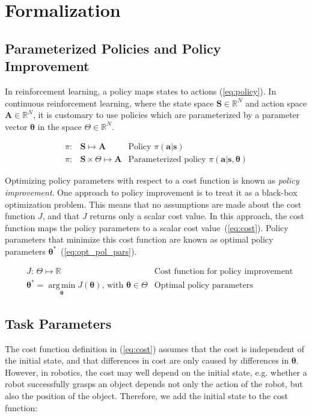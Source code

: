 \documentclass[12pt]{article}
\newcommand{\mymath}[1]{\ensuremath{#1}\xspace}
\newcommand{\act}    {\mymath{\mathbf{a}}}
\newcommand{\actsp}  {\mymath{\mathbf{A}}}
\newcommand{\sta}    {\mymath{\mathbf{s}}}
\newcommand{\stasp}  {\mymath{\mathbf{S}}}
\newcommand{\app}    {\mymath{\bm{\theta}}}
\newcommand{\appsp}  {\mymath{\Theta}}
\newcommand{\costf}  {\mymath{J}}
\DeclareMathOperator*{\argmin}{arg\,min}
\newcommand{\argminvar}[1]{\ensuremath{\underset{#1}{{\argmin}}}}
\begin{document}
\section{Formalization}

\subsection{Parameterized Policies and Policy Improvement}
\label{sec:parameterized_policies}

In reinforcement learning, a policy maps states to actions (\ref{eq:policy}). In continuous reinforcement learning, where the state space $\stasp \in \mathbb{R}^N$ and action space $\actsp \in \mathbb{R}^N$,  it is customary to use policies which are parameterized by a parameter vector \app in the space $\appsp  \in \mathbb{R}^N$.

\begin{align}
\label{eq:policy}     \pi:& \stasp               \mapsto \actsp & \mbox{Policy~} \pi(\act|\sta)\\
\label{eq:policy_par} \pi:& \stasp \times \appsp \mapsto \actsp & \mbox{Parameterized policy~} \pi(\act|\sta,\app)
\end{align}


Optimizing policy parameters with respect to a cost function is known as \emph{policy improvement}. 
One approach to policy improvement is to treat it as a black-box optimization problem. This means that no assumptions are made about the cost function $J$, and that $J$ returns only a scalar cost value. In this approach, the cost function maps the policy parameters to a scalar cost value~(\ref{eq:cost}). Policy parameters that minimize this cost function are known as optimal policy parameters $\app^*$~(\ref{eq:opt_pol_pars}).

\begin{align}
& \costf\mbox{: } \appsp \mapsto \mathbb{R}&\mbox{Cost function for policy improvement}\label{eq:cost}\\
& \app^* = \argminvar{\app}\costf(\app) \mbox{,~with~} \app\in\appsp  & \mbox{Optimal policy parameters}\label{eq:opt_pol_pars}
\end{align}

\subsection{Task Parameters}

The cost function definition in (\ref{eq:cost}) assumes that the cost is independent of the initial state, and that differences in cost are only caused by differences in \app. However, in robotics, the cost may well depend on the initial state, e.g. whether a robot successfully grasps an object depends not only the action of the robot, but also the position of the object. Therefore, we add the initial state to the cost function:
\end{document}
